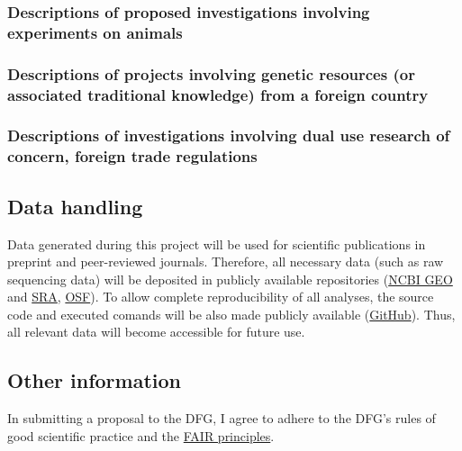 \documentclass{scrartcl}
\begin{document}
\subsubsection{Descriptions of proposed investigations involving experiments on animals}

\subsubsection{Descriptions of projects involving genetic resources (or associated traditional knowledge) from a foreign country}

\subsubsection{Descriptions of investigations involving dual use research of concern, foreign trade regulations}


\subsection{Data handling}
Data generated during this project will be used for scientific publications in
preprint and peer-reviewed journals. Therefore, all necessary data (such as raw
sequencing data) will be deposited in publicly available repositories
(\href{https://www.ncbi.nlm.nih.gov/geo/}{NCBI GEO} and
\href{https://www.ncbi.nlm.nih.gov/sra}{SRA}, \href{https://osf.io/}{OSF}). To
allow complete reproducibility of all analyses, the source code and executed
comands will be also made publicly available
(\href{https://github.com/}{GitHub}).  Thus, all relevant data will become
accessible for future use. 

\subsection{Other information}
In submitting a proposal to the DFG, I agree to adhere to the DFG's rules of good scientific practice and the \href{https://www.nature.com/articles/sdata201618}{FAIR principles}.



\end{document}
